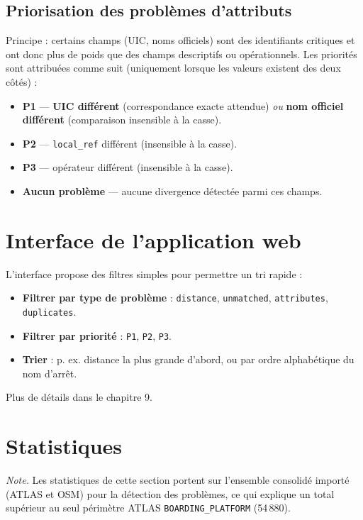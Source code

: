 \subsection{Priorisation des problèmes d'attributs}
Principe : certains champs (UIC, noms officiels) sont des identifiants critiques et ont donc plus de poids que des champs descriptifs ou opérationnels. Les priorités sont attribuées comme suit (uniquement lorsque les valeurs existent des deux côtés) :
\begin{itemize}
  \item \textbf{P1} — \textbf{UIC différent} (correspondance exacte attendue) \emph{ou} \textbf{nom officiel différent} (comparaison insensible à la casse).
  \item \textbf{P2} — \texttt{local\_ref} différent (insensible à la casse).
  \item \textbf{P3} — opérateur différent (insensible à la casse).
  \item \textbf{Aucun problème} — aucune divergence détectée parmi ces champs.
\end{itemize}

\section{Interface de l'application web}
L'interface propose des filtres simples pour permettre un tri rapide :
\begin{itemize}
  \item \textbf{Filtrer par type de problème} : \texttt{distance}, \texttt{unmatched}, \texttt{attributes}, \texttt{duplicates}.
  \item \textbf{Filtrer par priorité} : \texttt{P1}, \texttt{P2}, \texttt{P3}.
  \item \textbf{Trier} : p. ex. distance la plus grande d'abord, ou par ordre alphabétique du nom d'arrêt.
\end{itemize}

Plus de détails dans le chapitre 9.


\section{Statistiques }
\noindent\textit{Note.} Les statistiques de cette section portent sur l'ensemble consolidé importé (ATLAS et OSM) pour la détection des problèmes, ce qui explique un total supérieur au seul périmètre ATLAS \texttt{BOARDING\_PLATFORM} (54\,880).

